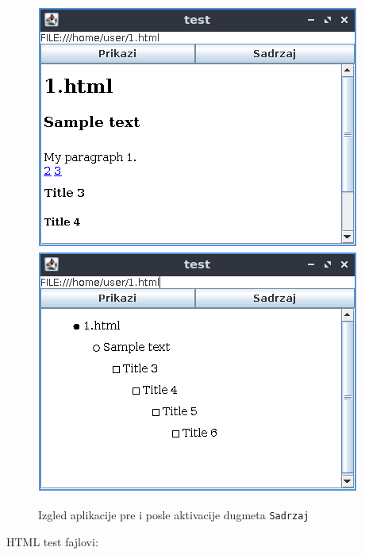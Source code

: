 \documentclass[]{article}
\begin{document}
\begin{figure}[H]
  \centering
  \includegraphics[scale=0.7]{fig1.PNG}
  \includegraphics[scale=0.7]{fig2.PNG}
  \label{fig2}
  \caption{Izgled aplikacije pre i posle aktivacije dugmeta \texttt{Sadrzaj}}
\end{figure}


HTML test fajlovi:\\
\end{document}
